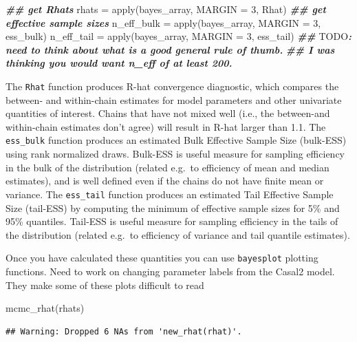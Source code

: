 \documentclass[
]{book}
\newenvironment{Shaded}{\begin{snugshade}}{\end{snugshade}}
\newcommand{\AlertTok}[1]{\textcolor[rgb]{0.94,0.16,0.16}{#1}}
\newcommand{\AttributeTok}[1]{\textcolor[rgb]{0.77,0.63,0.00}{#1}}
\newcommand{\DecValTok}[1]{\textcolor[rgb]{0.00,0.00,0.81}{#1}}
\newcommand{\DocumentationTok}[1]{\textcolor[rgb]{0.56,0.35,0.01}{\textbf{\textit{#1}}}}
\newcommand{\FunctionTok}[1]{\textcolor[rgb]{0.00,0.00,0.00}{#1}}
\newcommand{\NormalTok}[1]{#1}
\newcommand{\OtherTok}[1]{\textcolor[rgb]{0.56,0.35,0.01}{#1}}
\begin{document}
\begin{Shaded}
\begin{Highlighting}[]
\DocumentationTok{\#\# get Rhats}
\NormalTok{rhats }\OtherTok{=} \FunctionTok{apply}\NormalTok{(bayes\_array, }\AttributeTok{MARGIN =} \DecValTok{3}\NormalTok{, Rhat)}
\DocumentationTok{\#\# get effective sample sizes}
\NormalTok{n\_eff\_bulk }\OtherTok{=} \FunctionTok{apply}\NormalTok{(bayes\_array, }\AttributeTok{MARGIN =} \DecValTok{3}\NormalTok{, ess\_bulk)}
\NormalTok{n\_eff\_tail }\OtherTok{=} \FunctionTok{apply}\NormalTok{(bayes\_array, }\AttributeTok{MARGIN =} \DecValTok{3}\NormalTok{, ess\_tail)}
\DocumentationTok{\#\# }\AlertTok{TODO}\DocumentationTok{: need to think about what is a good general rule of thumb. }
\DocumentationTok{\#\# I was thinking you would want n\_eff of at least 200.}
\end{Highlighting}
\end{Shaded}

The \texttt{Rhat} function produces R-hat convergence diagnostic, which compares the between- and within-chain estimates for model parameters and other univariate quantities of interest. Chains that have not mixed well (i.e., the between-and within-chain estimates don't agree) will result in R-hat larger than 1.1. The \texttt{ess\_bulk} function produces an estimated Bulk Effective Sample Size (bulk-ESS) using rank normalized draws. Bulk-ESS is useful measure for sampling efficiency in the bulk of the distribution (related e.g.~to efficiency of mean and median estimates), and is well defined even if the chains do not have finite mean or variance. The \texttt{ess\_tail} function produces an estimated Tail Effective Sample Size (tail-ESS) by computing the minimum of effective sample sizes for 5\% and 95\% quantiles. Tail-ESS is useful measure for sampling efficiency in the tails of the distribution (related e.g.~to efficiency of variance and tail quantile estimates).

Once you have calculated these quantities you can use \texttt{bayesplot} plotting functions. Need to work on changing parameter labels from the Casal2 model. They make some of these plots difficult to read

\begin{Shaded}
\begin{Highlighting}[]
\FunctionTok{mcmc\_rhat}\NormalTok{(rhats)}
\end{Highlighting}
\end{Shaded}

\begin{verbatim}
## Warning: Dropped 6 NAs from 'new_rhat(rhat)'.
\end{verbatim}
\end{document}
